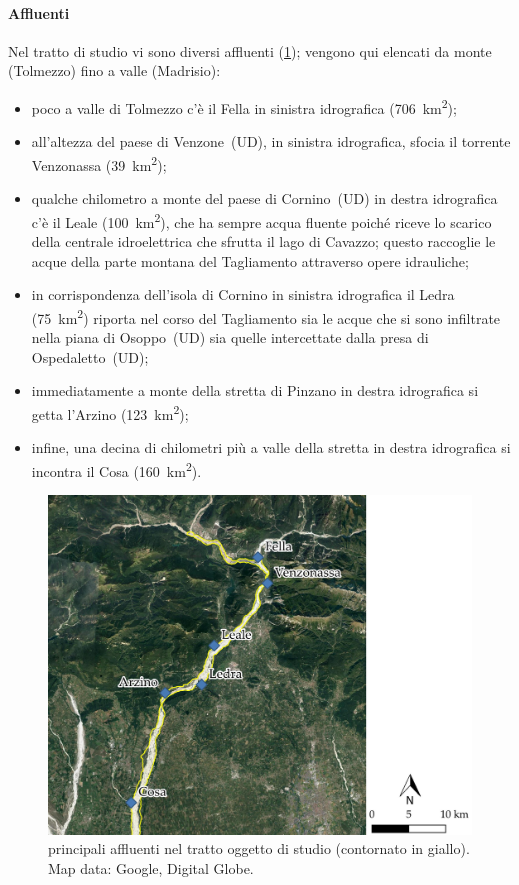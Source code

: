 \paragraph{Affluenti}
Nel tratto di studio vi sono diversi affluenti (\cref{fig:affluenti}); vengono qui elencati da monte (Tolmezzo) fino a valle (Madrisio):
%
\begin{itemize}
	\item poco a valle di Tolmezzo c'è il Fella in sinistra idrografica (\SI{706}{\kilo\m\tothe{2}});
	\item all'altezza del paese di Venzone~(UD), in sinistra idrografica, sfocia il torrente Venzonassa (\SI{39}{\kilo\m\tothe{2}});
	\item qualche chilometro a monte del paese di Cornino~(UD) in destra idrografica c'è il Leale (\SI{100}{\kilo\m\tothe{2}}), che ha sempre acqua fluente poiché riceve lo scarico della centrale idroelettrica che sfrutta il lago di Cavazzo; questo raccoglie le acque della parte montana del Tagliamento attraverso opere idrauliche;
	\item in corrispondenza dell'isola di Cornino in sinistra idrografica il Ledra (\SI{75}{\kilo\m\tothe{2}}) riporta nel corso del Tagliamento sia le acque che si sono infiltrate nella piana di Osoppo~(UD)  sia quelle intercettate dalla presa di Ospedaletto~(UD);
	\item immediatamente a monte della stretta di Pinzano in destra idrografica si getta l'Arzino (\SI{123}{\kilo\m\tothe{2}});
	\item infine, una decina di chilometri più a valle della stretta in destra idrografica si incontra il Cosa (\SI{160}{\kilo\m\tothe{2}}).
\end{itemize}
%
\begin{figure}
	\centering
	\includegraphics[width=\textwidth]{files/overview_affluenti.jpeg}
	\caption[principali affluenti nel tratto oggetto di studio]{principali affluenti nel tratto oggetto di studio (contornato in giallo).
	\\
	Map data: Google, Digital Globe.}
	\label{fig:affluenti}
\end{figure}
